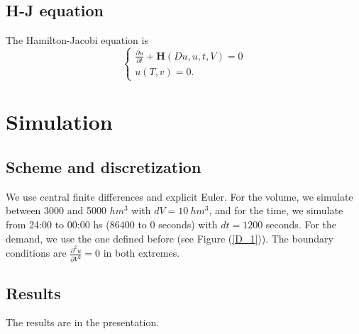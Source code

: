 \documentclass[12pt]{article}
\theoremstyle{definition}
\theoremstyle{remark}
\begin{document}
\subsection{H-J equation}

The Hamilton-Jacobi equation is
\begin{equation*}
\begin{cases}
\frac{\partial u}{\partial t}+\mathbf{H}(Du,u,t,V)=0\\
u(T,v)=0.
\end{cases}
\end{equation*}

\section{Simulation}

\subsection{Scheme and discretization}

We use central finite differences and explicit Euler. For the volume, we simulate between 3000 and 5000 $hm^3$ with $dV=10\ hm^3$, and for the time, we simulate from 24:00 to 00:00 hs (86400 to 0 seconds) with $dt=1200$ seconds. For the demand, we use the one defined before (see Figure (\ref{D_1})). The boundary conditions are $\frac{\partial^2 u}{\partial V^2}=0$ in both extremes.

\subsection{Results}

The results are in the presentation.
\end{document}
